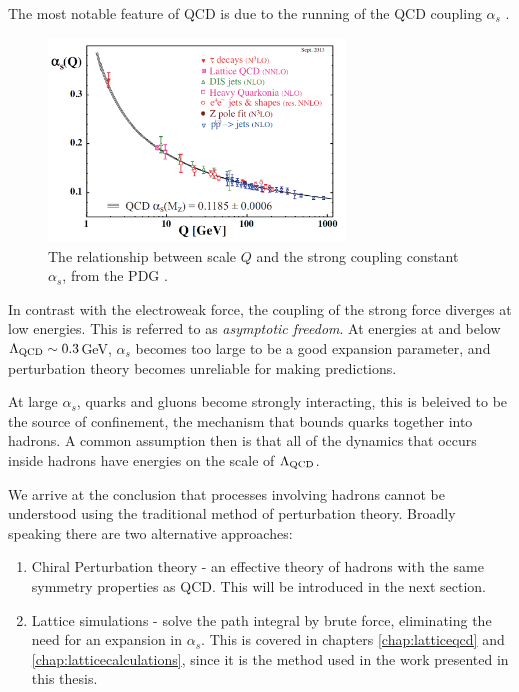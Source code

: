 The most notable feature of QCD is due to the running of the QCD coupling $\alpha_s$ \cite{PhysRevLett.30.1343}.
\begin{figure}
  \begin{center}
    \includegraphics[width=0.7\textwidth]{images/QCD-running-coupling.png}
  \end{center}
  \caption{The relationship between scale $Q$ and the strong coupling constant $\alpha_s$, from the PDG \cite{PhysRevD.98.030001}.}
  \label{fig:semileptonic}
\end{figure}
In contrast with the electroweak force, the coupling of the strong force diverges at low energies. This is referred to as {\it{asymptotic freedom}}. At energies at and below $\Lambda_{\text{QCD}} \sim 0.3$GeV, $\alpha_s$ becomes too large to be a good expansion parameter, and perturbation theory becomes unreliable for making predictions.

At large $\alpha_s$, quarks and gluons become strongly interacting, this is beleived to be the source of confinement, the mechanism that bounds quarks together into hadrons. A common assumption then is that all of the dynamics that occurs inside hadrons have energies on the scale of $\Lambda_{\text{QCD}}$.

We arrive at the conclusion that processes involving hadrons cannot be understood using the traditional method of perturbation theory. Broadly speaking there are two alternative approaches:
\begin{enumerate}
\item
  Chiral Perturbation theory - an effective theory of hadrons with the same symmetry properties as QCD. This will be introduced in the next section.
\item
  Lattice simulations - solve the path integral by brute force, eliminating the need for an expansion in $\alpha_s$. This is covered in chapters \ref{chap:latticeqcd} and \ref{chap:latticecalculations}, since it is the method used in the work presented in this thesis.
\end{enumerate}

